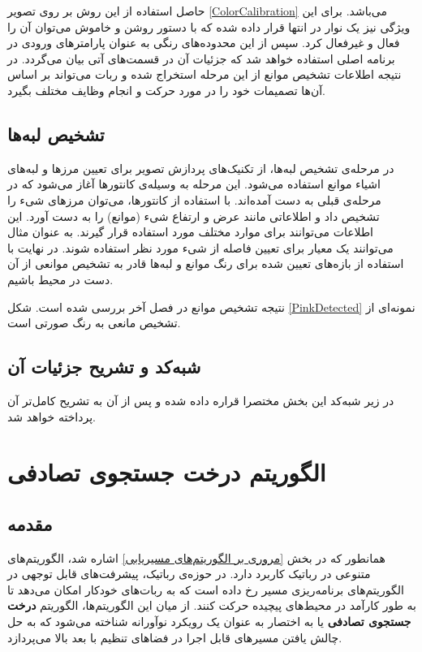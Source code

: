 حاصل استفاده از این روش بر روی تصویر
\ref{ColorCalibration}
می‌باشد. برای این ویژگی نیز یک نوار در انتها قرار داده شده که با دستور روشن و خاموش می‌توان آن را فعال و غیرفعال کرد.
سپس از این محدوده‌های رنگی به عنوان پارامترهای ورودی در برنامه اصلی استفاده خواهد شد که جزئیات آن در قسمت‌های آتی بیان می‌گردد.
در نتیجه اطلاعات تشخیص موانع از این مرحله استخراج شده و ربات می‌تواند بر اساس آن‌ها تصمیمات خود را در مورد حرکت و انجام وظایف مختلف بگیرد.


\subsection{تشخیص لبه‌ها}

در مرحله‌ی تشخیص لبه‌ها، از تکنیک‌های پردازش تصویر برای تعیین مرزها و لبه‌های اشیاء موانع استفاده می‌شود. این مرحله به وسیله‌ی کانتورها آغاز می‌شود که در مرحله‌ی قبلی به دست آمده‌اند. با استفاده از کانتورها، می‌توان مرزهای شیء را تشخیص داد و اطلاعاتی مانند عرض و ارتفاع شیء (موانع) را به دست آورد. این اطلاعات می‌توانند برای موارد مختلف مورد استفاده قرار گیرند.
به عنوان مثال می‌توانند یک معیار برای تعیین فاصله از شیء مورد نظر استفاده شوند.
در نهایت با استفاده از بازه‌های تعیین شده برای رنگ‌ موانع و لبه‌ها قادر به تشخیص موانعی از آن دست در محیط باشیم.

نتیجه تشخیص موانع در فصل آخر بررسی شده است. شکل
\ref{PinkDetected}
نمونه‌ای از تشخیص مانعی به رنگ صورتی است. 

\subsection{شبه‌کد و تشریح جزئیات آن}
در زیر شبه‌کد این بخش مختصرا قراره داده شده و پس از آن به تشریح کامل‌تر آن پرداخته خواهد شد.
\section*{}
\begin{latin}
	
\end{latin}

\section{الگوریتم درخت جستجوی تصادفی}
\subsection{مقدمه}
همانطور که در بخش
\ref{مروری بر الگوریتم‌های مسیریابی}
اشاره شد، الگوریتم‌های متنوعی در رباتیک کاربرد دارد.
در حوزه‌ی رباتیک، پیشرفت‌های قابل توجهی در الگوریتم‌های برنامه‌ریزی مسیر رخ داده است که به ربات‌های خودکار امکان می‌دهد تا به طور کارآمد در محیط‌های پیچیده حرکت کنند. از میان این الگوریتم‌ها، الگوریتم 
\textbf{درخت جستجوی تصادفی}
\noindent\unskip{}
یا به اختصار
به عنوان یک رویکرد نوآورانه شناخته می‌شود که به حل چالش یافتن مسیرهای قابل اجرا در فضاهای تنظیم با بعد بالا می‌پردازد. 

